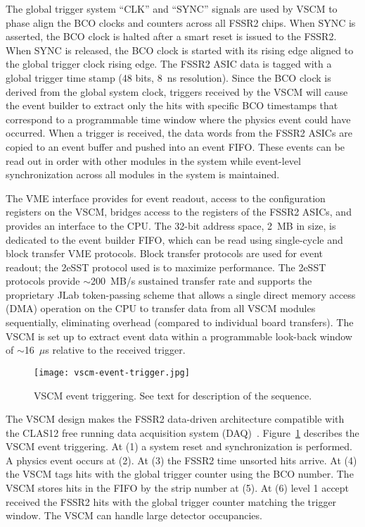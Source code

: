 The global trigger system ``CLK'' and ``SYNC'' signals are used by VSCM to phase align the BCO clocks and counters
across all FSSR2 chips. When SYNC is asserted, the BCO clock is halted after a smart reset is issued to the FSSR2.
When SYNC is released, the BCO clock is started with its rising edge aligned to the global trigger clock rising edge.
The FSSR2 ASIC data is tagged with a global trigger time stamp (48 bits, 8~ns resolution). Since the BCO clock is
derived from the global system clock, triggers received by the VSCM will cause the event builder to extract only the
hits with specific BCO timestamps that correspond to a programmable time window where the physics event could
have occurred. When a trigger is received, the data words from the FSSR2 ASICs are copied to an event buffer and
pushed into an event FIFO. These events can be read out in order with other modules in the system while event-level
synchronization across all modules in the system is maintained.

The VME interface provides for event readout, access to the configuration registers on the VSCM, bridges access to
the registers of the FSSR2 ASICs, and provides an interface to the CPU. The 32-bit address space, 2~MB in size, is
dedicated to the event builder FIFO, which can be read using single-cycle and block transfer VME protocols. Block
transfer protocols are used for event readout; the 2eSST protocol used is to maximize performance. The 2eSST
protocols provide $\sim$200~MB/s sustained transfer rate and supports the proprietary JLab token-passing
scheme that allows a single direct memory access (DMA) operation on the CPU to transfer data from all VSCM
modules sequentially, eliminating overhead (compared to individual board transfers). The VSCM is set up to extract
event data within a programmable look-back window of $\sim$16~$\mu$s relative to the received trigger. 

\begin{figure}[hbt] 
\centering 
\texttt{[image: vscm-event-trigger.jpg]}
\caption{VSCM event triggering. See text for description of the sequence.}
\label{fig:vscm-event-trigger}
\end{figure}

The VSCM design makes the FSSR2 data-driven architecture compatible with the CLAS12 free running data
acquisition system (DAQ)~\cite{daq-nim}. Figure~\ref{fig:vscm-event-trigger} describes the VSCM event
triggering. At (1) a system reset and synchronization is performed. A physics event occurs at (2). At (3) the FSSR2
time unsorted hits arrive. At (4) the VSCM tags hits with the global trigger counter using the BCO number. The
VSCM stores hits in the FIFO by the strip number at (5). At (6) level 1 accept received the FSSR2 hits with the
global trigger counter matching the trigger window. The VSCM can handle large detector occupancies.


